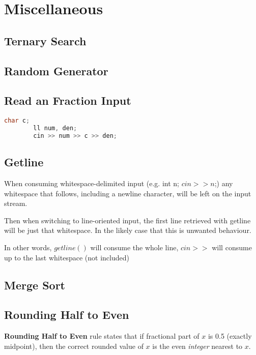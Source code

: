 \chapter{Miscellaneous}

\section{Ternary Search}


\section{Random Generator}


\section{Read an Fraction Input}

    \begin{lstlisting}[language=c++]
        char c;
        ll num, den;
        cin >> num >> c >> den;
    \end{lstlisting}

\section{Getline}

    When consuming whitespace-delimited input (e.g. int n; $cin >> n$;) any whitespace that follows, 
    including a newline character, will be left on the input stream. 

    Then when switching to line-oriented input, the first line retrieved with getline will be just that whitespace. In the likely case that this is unwanted behaviour.

    In other words, $getline()$ will consume the whole line, $cin>>$ will consume up to the last whitespace (not included) 


\section{Merge Sort}


\section{Rounding Half to Even}

    \textbf{Rounding Half to Even} rule states that 
    if fractional part of $x$ is 0.5 (exactly midpoint), then the correct rounded value of $x$ is the even \textit{integer} nearest to $x$.

